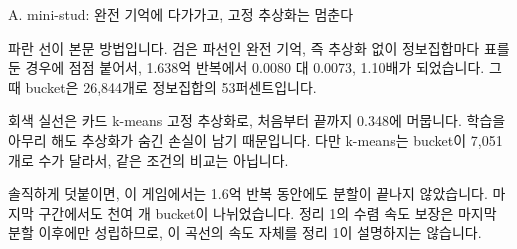 \documentclass[aspectratio=169,11pt]{beamer}
\begin{document}
\begin{frame}{A. mini-stud: 완전 기억에 다가가고, 고정 추상화는 멈춘다}
{파란 선이 본문 방법입니다. 검은 파선인 완전 기억, 즉 추상화 없이 정보집합마다 표를 둔 경우에 점점 붙어서, 1.638억 반복에서 0.0080 대 0.0073, 1.10배가 되었습니다. 그때 bucket은 26,844개로 정보집합의 53퍼센트입니다.\par
회색 실선은 카드 k-means 고정 추상화로, 처음부터 끝까지 0.348에 머뭅니다. 학습을 아무리 해도 추상화가 숨긴 손실이 남기 때문입니다. 다만 k-means는 bucket이 7,051개로 수가 달라서, 같은 조건의 비교는 아닙니다.\par
솔직하게 덧붙이면, 이 게임에서는 1.6억 반복 동안에도 분할이 끝나지 않았습니다. 마지막 구간에서도 천여 개 bucket이 나뉘었습니다. 정리 1의 수렴 속도 보장은 마지막 분할 이후에만 성립하므로, 이 곡선의 속도 자체를 정리 1이 설명하지는 않습니다.}
\end{frame}

\end{document}

